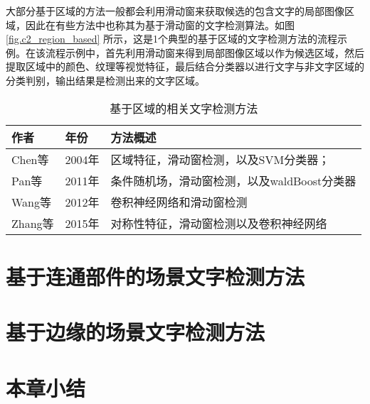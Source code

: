     大部分基于区域的方法一般都会利用滑动窗来获取候选的包含文字的局部图像区域，因此在有些方法中也称其为基于滑动窗的文字检测算法。如图\ref{fig.c2_region_based} 所示，这是1个典型的基于区域的文字检测方法的流程示例。在该流程示例中，首先利用滑动窗来得到局部图像区域以作为候选区域，然后提取区域中的颜色、纹理等视觉特征，最后结合分类器以进行文字与非文字区域的分类判别，输出结果是检测出来的文字区域。

    \begin{table*}[!h]
    \centering
    \caption{基于区域的相关文字检测方法}
    \begin{tabular}{p{}|p{}| p{}}
    \hline
    作者 & 年份 & 方法概述 \\
    \hline
    Chen等\cite{Chen2004Detecting} & 2004年 & 区域特征，滑动窗检测，以及SVM分类器；\\
    Pan等\cite{Pan2011A} & 2011年 &   条件随机场，滑动窗检测，以及waldBoost分类器\\
    Wang等\cite{Wang2012End} & 2012年 & 卷积神经网络和滑动窗检测 \\
    Zhang等\cite{Zhang2015Symmetry} & 2015年 & 对称性特征，滑动窗检测以及卷积神经网络 \\
    \hline
    \end{tabular}
    \label{tab.c2_region_based}
    \end{table*}

    \section{基于连通部件的场景文字检测方法}

    \section{基于边缘的场景文字检测方法}

    \section{本章小结}

